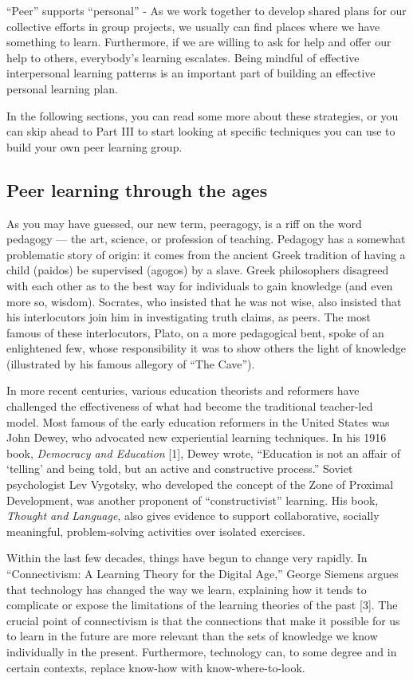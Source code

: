 ``Peer'' supports ``personal'' - As we work together to develop shared
plans for our collective efforts in group projects, we usually can find
places where we have something to learn. Furthermore, if we are willing
to ask for help and offer our help to others, everybody's learning
escalates. Being mindful of effective interpersonal learning patterns is
an important part of building an effective personal learning plan.

In the following sections, you can read some more about these
strategies, or you can skip ahead to Part III to start looking at
specific techniques you can use to build your own peer learning group.

\subsection{Peer learning through the ages}

As you may have guessed, our new term, peeragogy, is a riff on the word
pedagogy --- the art, science, or profession of teaching. Pedagogy has a
somewhat problematic story of origin: it comes from the ancient Greek
tradition of having a child (paidos) be supervised (agogos) by a slave.
Greek philosophers disagreed with each other as to the best way for
individuals to gain knowledge (and even more so, wisdom). Socrates, who
insisted that he was not wise, also insisted that his interlocutors join
him in investigating truth claims, as peers. The most famous of these
interlocutors, Plato, on a more pedagogical bent, spoke of an
enlightened few, whose responsibility it was to show others the light of
knowledge (illustrated by his famous allegory of ``The Cave'').

In more recent centuries, various education theorists and reformers have
challenged the effectiveness of what had become the traditional
teacher-led model. Most famous of the early education reformers in the
United States was John Dewey, who advocated new experiential learning
techniques. In his 1916 book, \emph{Democracy and Education} {[}1{]},
Dewey wrote, ``Education is not an affair of `telling' and being told,
but an active and constructive process.'' Soviet psychologist Lev
Vygotsky, who developed the concept of the Zone of Proximal Development,
was another proponent of ``constructivist'' learning. His book,
\emph{Thought and Language}, also gives evidence to support
collaborative, socially meaningful, problem-solving activities over
isolated exercises.

Within the last few decades, things have begun to change very rapidly.
In ``Connectivism: A Learning Theory for the Digital Age,'' George
Siemens argues that technology has changed the way we learn, explaining
how it tends to complicate or expose the limitations of the learning
theories of the past {[}3{]}. The crucial point of connectivism is that
the connections that make it possible for us to learn in the future are
more relevant than the sets of knowledge we know individually in the
present. Furthermore, technology can, to some degree and in certain
contexts, replace know-how with know-where-to-look.


